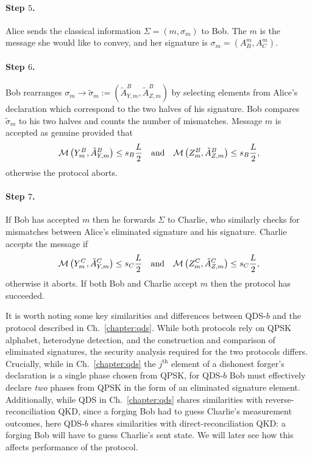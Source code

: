 \paragraph{Step $5$.} Alice sends the classical information $\Sigma = \left(m, \sigma_m\right)$ to Bob. The $m$ is the message she would like to convey, and her signature is $\sigma_m = \left(A_B^m, A_C^m\right)$. 

\paragraph{Step $6$.} Bob rearranges $\sigma_m \rightarrow \tilde{\sigma}_m := \left(\tilde{A}_{Y, m}^B, \tilde{A}_{Z, m}^B\right)$ by selecting elements from Alice's declaration which correspond to the two halves of his signature. Bob compares $\tilde{\sigma}_m$ to his two halves and counts the number of mismatches. Message $m$ is accepted as genuine provided that
\begin{equation}
\mathcal{M}\left(Y_m^B, \tilde{A}_{Y, m}^B\right) \le s_B \frac{L}{2} \qq{and} \mathcal{M}\left(Z_m^B, \tilde{A}_{Z, m}^B\right) \le s_B \frac{L}{2},
\end{equation}
otherwise the protocol aborts. %

\paragraph{Step $7$.} If Bob has accepted $m$ then he forwards $\Sigma$ to Charlie, who similarly checks for mismatches between Alice's eliminated signature and his signature. Charlie accepts the message if
\begin{equation}
\mathcal{M}\left(Y_m^C, \tilde{A}_{Y, m}^C\right) \le s_C \frac{L}{2} \qq{and} \mathcal{M}\left(Z_m^C, \tilde{A}_{Z, m}^C\right) \le s_C \frac{L}{2},
\end{equation}
otherwise it aborts. %
If both Bob and Charlie accept $m$ then the protocol has succeeded. 

It is worth noting some key similarities and differences between QDS-$b$ and the protocol described in Ch.~\ref{chapter:qds}. While both protocols rely on QPSK alphabet, heterodyne detection, and the construction and comparison of eliminated signatures, the security analysis required for the two protocols differs. Crucially, while in Ch.~\ref{chapter:qds} the $j^{\text{th}}$ element of a dishonest forger's declaration is a single phase chosen from QPSK, for QDS-$b$ Bob must effectively declare \emph{two} phases from QPSK in the form of an eliminated signature element. Additionally, while QDS in Ch.~\ref{chapter:qds} shares similarities with reverse-reconciliation QKD, since a forging Bob had to guess Charlie's measurement outcomes, here QDS-$b$ shares similarities with direct-reconciliation QKD: a forging Bob will have to guess Charlie's sent state. We will later see how this affects performance of the protocol. 


